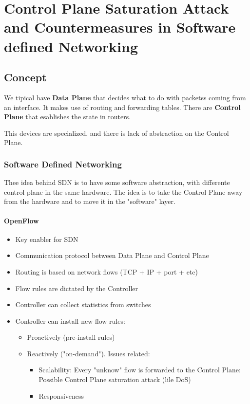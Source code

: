 \chapter{Control Plane Saturation Attack and Countermeasures in Software
defined Networking}

\section{Concept}
We tipical have \textbf{Data Plane} that decides what to do with packetss coming
from an interface. It makes use of routing and forwarding tables.
There are \textbf{Control Plane} that esablishes the state in routers.

This devices are specialized, and there is lack of abstraction on the Control
Plane.

\subsection{Software Defined Networking}
Thee idea behind SDN is to have some software abstraction, with differente
control plane in the same hardware.
The idea is to take the Control Plane away from the hardware and to move it in
the "software" layer.

\subsubsection{OpenFlow}
\begin{itemize}
  \item Key enabler for SDN
  \item Communication protocol between Data Plane and Control Plane
  \item Routing is based on network flows (TCP + IP + port + etc)
  \item Flow rules are dictated by the Controller
  \item Controller can collect statistics from switches
  \item Controller can install new flow rules:
  \begin{itemize}
    \item Proactively (pre-install rules)
    \item Reactively ("on-demand"). Issues related:
    \begin{itemize}
      \item Scalability: Every "unknow" flow is forwarded to the Control
Plane: Possible Control Plane saturation attack (lile DoS)
      \item Responsiveness
    \end{itemize}
  \end{itemize}
\end{itemize}

